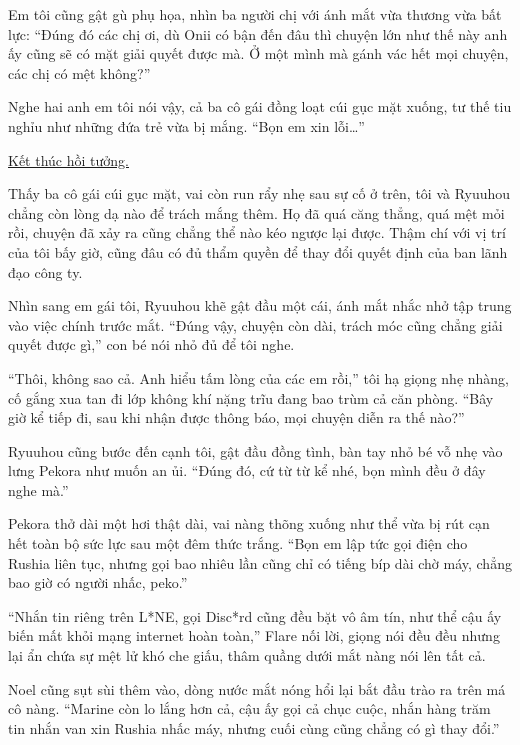 \documentclass[../main.tex]{subfiles}
\begin{document}
Em tôi cũng gật gù phụ họa, nhìn ba người chị với ánh mắt vừa thương vừa bất lực: ``Đúng đó các chị ơi, dù Onii có bận đến đâu thì chuyện lớn như thế này anh ấy cũng sẽ có mặt giải quyết được mà. Ở một mình mà gánh vác hết mọi chuyện, các chị có mệt không?''

Nghe hai anh em tôi nói vậy, cả ba cô gái đồng loạt cúi gục mặt xuống, tư thế tiu nghỉu như những đứa trẻ vừa bị mắng. ``Bọn em xin lỗi\dots''

\begin{center}
    \uline{Kết thúc hồi tưởng.}
\end{center}

Thấy ba cô gái cúi gục mặt, vai còn run rẩy nhẹ sau sự cố ở trên, tôi và Ryuuhou chẳng còn lòng dạ nào để trách mắng thêm. Họ đã quá căng thẳng, quá mệt mỏi rồi, chuyện đã xảy ra cũng chẳng thể nào kéo ngược lại được. Thậm chí với vị trí của tôi bấy giờ, cũng đâu có đủ thẩm quyền để thay đổi quyết định của ban lãnh đạo công ty.

Nhìn sang em gái tôi, Ryuuhou khẽ gật đầu một cái, ánh mắt nhắc nhở tập trung vào việc chính trước mắt. ``Đúng vậy, chuyện còn dài, trách móc cũng chẳng giải quyết được gì,'' con bé nói nhỏ đủ để tôi nghe.

``Thôi, không sao cả. Anh hiểu tấm lòng của các em rồi,'' tôi hạ giọng nhẹ nhàng, cố gắng xua tan đi lớp không khí nặng trĩu đang bao trùm cả căn phòng. ``Bây giờ kể tiếp đi, sau khi nhận được thông báo, mọi chuyện diễn ra thế nào?''

Ryuuhou cũng bước đến cạnh tôi, gật đầu đồng tình, bàn tay nhỏ bé vỗ nhẹ vào lưng Pekora như muốn an ủi. ``Đúng đó, cứ từ từ kể nhé, bọn mình đều ở đây nghe mà.''

Pekora thở dài một hơi thật dài, vai nàng thõng xuống như thể vừa bị rút cạn hết toàn bộ sức lực sau một đêm thức trắng. ``Bọn em lập tức gọi điện cho Rushia liên tục, nhưng gọi bao nhiêu lần cũng chỉ có tiếng bíp dài chờ máy, chẳng bao giờ có người nhấc, peko.''

``Nhắn tin riêng trên L*NE, gọi Disc*rd cũng đều bặt vô âm tín, như thể cậu ấy biến mất khỏi mạng internet hoàn toàn,'' Flare nối lời, giọng nói đều đều nhưng lại ẩn chứa sự mệt lử khó che giấu, thâm quầng dưới mắt nàng nói lên tất cả.

Noel cũng sụt sùi thêm vào, dòng nước mắt nóng hổi lại bắt đầu trào ra trên má cô nàng. ``Marine còn lo lắng hơn cả, cậu ấy gọi cả chục cuộc, nhắn hàng trăm tin nhắn van xin Rushia nhấc máy, nhưng cuối cùng cũng chẳng có gì thay đổi.''
\end{document}
